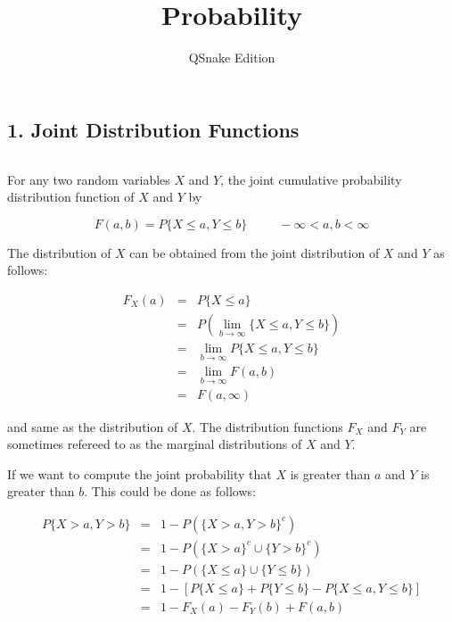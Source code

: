 


\title{Probability}

\author{QSnake Edition}

\maketitle

\subsection*{1. Joint Distribution Functions}$ $

For any two random variables $X$ and $Y$, the joint cumulative probability distribution function of $X$ and $Y$ by

$$F(a,b) = P\{X \leq a,Y \leq b\} \hspace{30pt} - \infty < a,b < \infty$$

The distribution of $X$ can be obtained from the joint distribution of $X$ and $Y$ as follows:

\begin{eqnarray*}
	F_X(a) &=& P\{X \leq a\}\\
	&=&P\left(\lim_{b \rightarrow \infty} \{ X \leq a,Y\leq b \}\right)\\
	&=& \lim_{b \rightarrow \infty} P\{X \leq a,Y \leq b\}\\
	&=& \lim_{b \rightarrow \infty} F(a,b)\\
	&=& F(a,\infty)
\end{eqnarray*}

and same as the distribution of $X$. The distribution functions $F_X$ and $F_Y$ are sometimes refereed to as the marginal distributions of $X$ and $Y$.

If we want to compute the joint probability that $X$ is greater than $a$ and $Y$ is greater than $b$. This could be done as follows:

\begin{eqnarray*}
	P\{X > a,Y > b\} &=& 1 - P(\{X > a,Y > b\}^c)\\
	&=& 1 - P(\{X > a\}^c \cup \{Y > b\}^c)\\
	&=& 1 - P(\{X \leq a\} \cup \{Y \leq b\})\\
	&=& 1 - [P\{X \leq a\} + P\{Y \leq b\} - P\{X \leq a,Y \leq b\}]\\
	&=& 1 - F_X(a) - F_Y(b) + F(a,b)
\end{eqnarray*}

